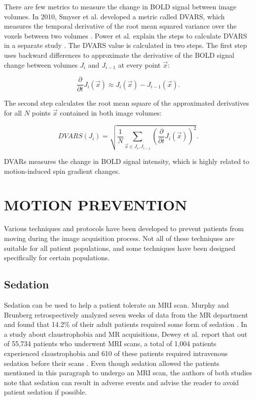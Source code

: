 There are few metrics to measure the change in BOLD signal between image volumes. In 2010, Smyser et al. developed a metric called DVARS, which measures the temporal derivative of the root mean squared variance over the voxels between two volumes \cite{Smyser2010}. Power et al. explain the steps to calculate DVARS in a separate study \cite{Power2012}. The DVARS value is calculated in two steps. The first step uses backward differences to approximate the derivative of the BOLD signal change between volumes $J_i$ and $J_{i-1}$ at every point $\vec{x}$:

\begin{equation}
\frac{\partial}{\partial t} J_i(\vec{x}) \approx J_i(\vec{x}) - J_{i-1}(\vec{x}).
\end{equation}

The second step calculates the root mean square of the approximated derivatives for all $N$ points $\vec{x}$ contained in both image volumes:

\begin{equation}
DVARS(J_i) = \sqrt{ \frac{1}{N} \sum_{\vec{x} \in J_i, J_{i-1}} \left( \frac{\partial}{\partial t} J_i(\vec{x}) \right)^2 }.
\end{equation}

DVARs measures the change in BOLD signal intensity, which is highly related to motion-induced spin gradient changes. 

\section{MOTION PREVENTION}

Various techniques and protocols have been developed to prevent patients from moving during the image acquisition process. Not all of these techniques are suitable for all patient populations, and some techniques have been designed specifically for certain populations.

\subsection{Sedation}

Sedation can be used to help a patient tolerate an MRI scan. Murphy and Brunberg retrospectively analyzed seven weeks of data from the MR department and found that 14.2\% of their adult patients required some form of sedation \cite{Murphy1997}. In a study about claustrophobia and MR acquisitions, Dewey et al. report that out of 55,734 patients who underwent MRI scans, a total of 1,004 patients experienced claustrophobia and 610 of these patients required intravenous sedation before their scans \cite{Dewey2007}. Even though sedation allowed the patients mentioned in this paragraph to undergo an MRI scan, the authors of both studies note that sedation can result in adverse events and advise the reader to avoid patient sedation if possible.



